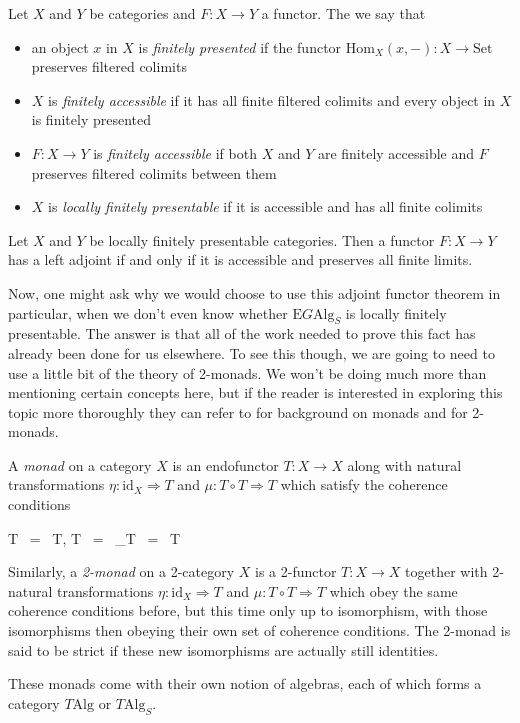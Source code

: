 \begin{defn} Let $X$ and $Y$ be categories and $F: X \to Y$ a functor. The we say that
\begin{itemize}
\item an object $x$ in $X$ is \emph{finitely presented} if the functor $\mathrm{Hom}_{X}(x, -) : X \to \mathrm{Set}$ preserves filtered colimits
\item $X$ is \emph{finitely accessible} if it has all finite filtered colimits and every object in $X$ is finitely presented
\item $F: X \to Y$ is \emph{finitely accessible} if both $X$ and $Y$ are finitely accessible and $F$ preserves filtered colimits between them
\item $X$ is \emph{locally finitely presentable} if it is accessible and has all finite colimits
\end{itemize}
\end{defn}

\begin{namedprop} \label{aftlfp}
Let $X$ and $Y$ be locally finitely presentable categories. Then a functor $F: X \to Y$ has a left adjoint if and only if it is accessible and preserves all finite limits. 
\end{namedprop}

Now, one might ask why we would choose to use this adjoint functor theorem in particular, when we don't even know whether $\mathrm{E}G\mathrm{Alg}_S$ is locally finitely presentable. The answer is that all of the work needed to prove this fact has already been done for us elsewhere. To see this though, we are going to need to use a little bit of the theory of 2-monads. We won't be doing much more than mentioning certain concepts here, but if the reader is interested in exploring this topic more thoroughly they can refer to \cite{monad1} \cite{monad2} for background on monads and \cite{2monad} for 2-monads.

\begin{defn} A \emph{monad} on a category $X$ is an endofunctor $T: X \to X$ along with natural transformations $\eta: \mathrm{id}_{X} \Rightarrow T$ and $\mu: T \circ T \Rightarrow T$ which satisfy the coherence conditions
\begin{eq*} \mu \circ \mu T \, = \, \mu \circ T\mu, \quad \quad \quad \mu \circ \eta T \, = \, _{T} \, = \, \mu \circ T\eta \end{eq*}
Similarly, a \emph{2-monad} on a 2-category $X$ is a 2-functor $T: X \to X$ together with 2-natural transformations $\eta: \mathrm{id}_{X} \Rightarrow T$ and $\mu: T \circ T \Rightarrow T$ which obey the same coherence conditions before, but this time only up to isomorphism, with those isomorphisms then obeying their own set of coherence conditions. The 2-monad is said to be strict if these new isomorphisms are actually still identities.

These monads come with their own notion of algebras, each of which forms a category $T\mathrm{Alg}$ or $T\mathrm{Alg}_S$.
\end{defn}

